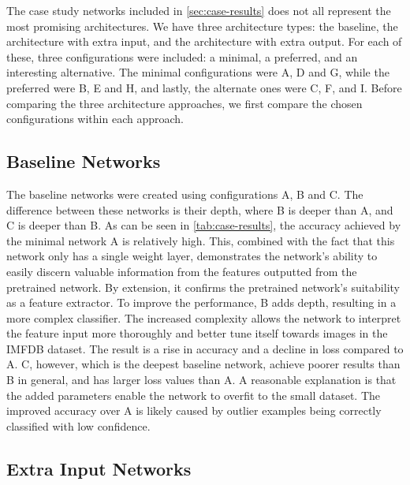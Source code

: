 The case study networks included in \autoref{sec:case-results} does not all represent the most promising architectures. We have three architecture types: the baseline, the architecture with extra input, and the architecture with extra output. For each of these, three configurations were included: a minimal, a preferred, and an interesting alternative. The minimal configurations were A, D and G, while the preferred were B, E and H, and lastly, the alternate ones were C, F, and I. Before comparing the three architecture approaches, we first compare the chosen configurations within each approach.

\subsection{Baseline Networks}

The baseline networks were created using configurations A, B and C. The difference between these networks is their depth, where B is deeper than A, and C is deeper than B. As can be seen in \autoref{tab:case-results}, the accuracy achieved by the minimal network A is relatively high. This, combined with the fact that this network only has a single weight layer, demonstrates the network's ability to easily discern valuable information from the features outputted from the pretrained network. By extension, it confirms the pretrained network's suitability as a feature extractor. To improve the performance, B adds depth, resulting in a more complex classifier. The increased complexity allows the network to interpret the feature input more thoroughly and better tune itself towards images in the IMFDB dataset. The result is a rise in accuracy and a decline in loss compared to A. C, however, which is the deepest baseline network, achieve poorer results than B in general, and has larger loss values than A. A reasonable explanation is that the added parameters enable the network to overfit to the small dataset. The improved accuracy over A is likely caused by outlier examples being correctly classified with low confidence.

\subsection{Extra Input Networks}

